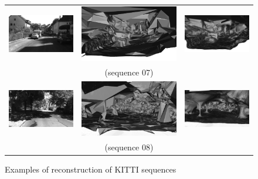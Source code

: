 \begin{figure}[tp]
\begin{tabular}{ccc}
\includegraphics[height=0.2\textwidth]{./img/ch-incr-dens/07aorig00}&
\includegraphics[height=0.2\textwidth]{./img/ch-incr-dens/07ainit00}&
\includegraphics[height=0.2\textwidth]{./img/ch-incr-dens/07aref00}\\
&(sequence 07)&\\
\includegraphics[height=0.2\textwidth]{./img/ch-incr-dens/08aorig00}&
\includegraphics[height=0.2\textwidth]{./img/ch-incr-dens/08ainit00}&
\includegraphics[height=0.2\textwidth]{./img/ch-incr-dens/08aref00}\\
&(sequence 08)&\\

\end{tabular}
\caption{Examples of reconstruction of KITTI sequences }
\label{fig:kitti2}
\end{figure}



